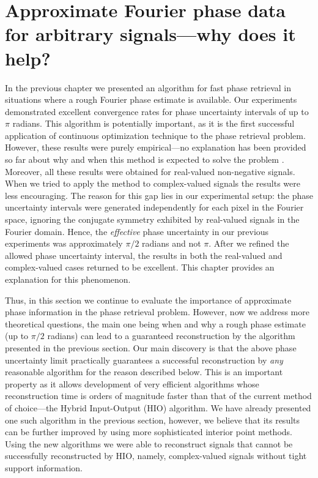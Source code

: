 \chapter{Approximate Fourier phase data for arbitrary
  signals---why does it help?\footnotemark{}}
\label{cha:appr-four-phase-explanation}


In the previous chapter we presented an algorithm for fast phase
retrieval in situations where a rough Fourier phase estimate is
available. Our experiments demonstrated excellent convergence rates for
phase uncertainty intervals of up to $\pi$ radians. This algorithm is
potentially important, as it is the first successful application of
continuous optimization technique to the phase retrieval problem.
However, these  results were purely empirical---no explanation
has been provided so far about why and when this method is expected to
solve the problem . Moreover, all these results were obtained for
real-valued non-negative signals. When we tried to apply the method to
complex-valued signals the results were less encouraging. The reason
for this gap lies in our experimental setup: the phase uncertainty intervals
were generated independently for each pixel in the Fourier
space, ignoring the conjugate symmetry exhibited by real-valued
signals in the Fourier domain. Hence, the \textit{effective} phase
uncertainty 
in our previous experiments was approximately $\pi/2$ radians and not
$\pi$. After we refined the allowed phase uncertainty interval, the
results in both the real-valued and complex-valued cases returned to be
excellent. This chapter provides an explanation for this phenomenon.


Thus, in this section we continue to evaluate the importance of
approximate phase information in the phase retrieval problem. However,
now we address more theoretical questions, the main one being
when and why a rough phase estimate (up to $\pi/2$ radians) can lead
to a guaranteed reconstruction by the algorithm presented in the
previous section. Our main discovery is that the above phase
uncertainty limit practically guarantees a successful reconstruction
by \textit{any} reasonable algorithm for the reason described
below. This is 
an  important property as it allows development of very
efficient algorithms whose reconstruction time is orders of magnitude
faster than that of the current method of choice---the Hybrid
Input-Output (HIO) algorithm. We have already presented one such
algorithm in the previous section, however, we believe that its
results can be further improved by using more sophisticated interior
point methods. Using the new algorithms we were able to reconstruct
signals that cannot be successfully reconstructed by HIO, namely,
complex-valued signals without tight support information.

